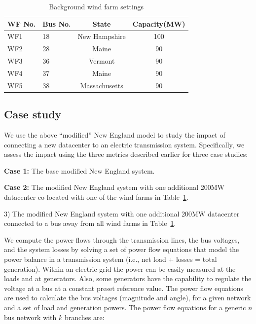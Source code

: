 \begin{table}[ht]
\begin{center}
\caption{Background wind farm settings}
\begin{tabular}{|l|l|c|c|}
\hline
WF No. & Bus No. & State & Capacity(MW) \\
\hline
WF1 & 18& New Hampshire & 100\\
WF2 & 28& Maine & 90 \\
WF3 & 36& Vermont & 90  \\
WF4 & 37& Maine & 90\\
WF5 & 38& Massachusetts & 90\\
\hline

\end{tabular}
   \vspace{.05in}
\label{tab:wf_setting}
\end{center}
\end{table}

\subsection{Case study}
\label{sec:casestudy}

We use the above ``modified'' New England model to study the impact of
connecting a new datacenter to an electric transmission system.
Specifically, we assess the impact using the three metrics described
earlier for three case studies:

{\bf Case 1:} The base modified New England system.

{\bf Case 2:} The modified New England system with one additional
200MW datacenter co-located with one of the wind farms in
Table~\ref{tab:wf_setting}.

3) The modified New England system with one additional 200MW
datacenter connected to a bus away from all wind farms in 
Table~\ref{tab:wf_setting}.

We compute the power flows through the transmission lines, the bus
voltages, and the system losses by solving a set of power flow
equations that model the power balance in a transmission system (i.e.,
net load + losses = total generation).
Within an electric grid the power
can be easily measured at the loads and at generators. Also, some
generators have the capability to regulate the voltage at a bus at a
constant preset reference value. The power flow equations are used to
calculate the bus voltages (magnitude and angle), for a given network
and a set of load and generation powers. The power flow equations for a
generic $n$ bus network with $k$ branches are:

